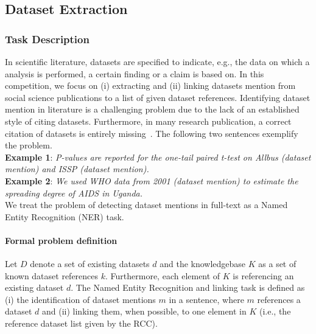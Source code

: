 \subsection{Dataset Extraction}
\label{sec:dataset-extraction}
\subsubsection{Task Description}
In scientific literature, datasets are specified to indicate, e.g., the data on which a analysis is performed, a certain finding or a claim is based on. In this competition, we focus on (i) extracting and (ii) linking datasets mention from social science publications to a list of given dataset references.
Identifying dataset mention in literature is a challenging problem due to the lack of an established style of citing datasets.
Furthermore, in many research publication, a correct citation of datasets is entirely missing~\cite{boland2012identifying}. 
The following two sentences exemplify the problem.\\ 
\textbf{Example 1}: \emph{P-values are reported for the one-tail paired t-test on \emph{Allbus} (dataset mention) and \emph{ISSP} (dataset mention).}\\
\textbf{Example 2}: \emph{We used \emph{WHO data from 2001} (dataset mention) to estimate the spreading degree of AIDS in Uganda.}\\
We treat the problem of detecting dataset mentions in full-text as a Named Entity Recognition (NER) task. 

\paragraph{Formal problem definition}%
Let $D$ denote a set of existing datasets $d$ and the knowledgebase $K$ as a set of known dataset references $k$. Furthermore, each element of $K$ is referencing an existing dataset $d$. The Named Entity Recognition and linking task is defined as (i) the identification of dataset mentions $m$ in a sentence, where $m$ references a dataset $d$ and (ii) linking them, when possible, to one element in $K$ (i.e., the reference dataset list given by the RCC). 


